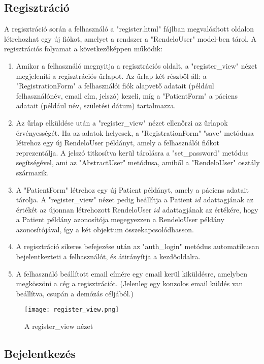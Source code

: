 \subsection{Regisztráció}

A regisztráció során a felhasználó a "register.html" fájlban megvalósított oldalon létrehozhat egy új fiókot, amelyet a rendszer a "RendeloUser" model-ben tárol. A regisztrációs folyamat a következőképpen működik:

\begin{enumerate}
	\item Amikor a felhasználó megnyitja a regisztrációs oldalt, a "register\_view" nézet megjeleníti a regisztrációs űrlapot. Az űrlap két részből áll: a "RegistrationForm" a felhasználói fiók alapvető adatait (például felhasználónév, email cím, jelszó) kezeli, míg a "PatientForm" a páciens adatait (például név, születési dátum) tartalmazza.
	\item Az űrlap elküldése után a "register\_view" nézet ellenőrzi az űrlapok érvényességét. Ha az adatok helyesek, a "RegistrationForm" "save" metódusa létrehoz egy új RendeloUser példányt, amely a felhasználói fiókot reprezentálja. A jelszó titkosítva kerül tárolásra a "set\_password" metódus segítségével, ami az "AbstractUser" metódusa, amiből a "RendeloUser" osztály származik.
	\item A "PatientForm" létrehoz egy új Patient példányt, amely a páciens adatait tárolja. A "register\_view" nézet pedig beállítja a Patient $id$ adattagjának az értékét az újonnan létrehozott RendeloUser $id$ adattagjának az értékére, hogy a Patient példány azonosítója megegyezzen a RendeloUser példány azonosítójával, így a két objektum összekapcsolódhasson.
	\item A regisztráció sikeres befejezése után az "auth\_login" metódus automatikusan bejelentkezteti a felhasználót, és átirányítja a kezdőoldalra.
	\item A felhasználó beállított email címére egy email kerül kiküldésre, amelyben megköszöni a cég a regisztrációt. (Jelenleg egy konzolos email küldés van beállítva, csupán a demózás céljából.)
\end{enumerate}

\begin{figure}[!htbp]
	\caption{A register\_view nézet}
	\label{fig:registerview}
	\centering
	\texttt{[image: register\_view.png]}
\end{figure}

\subsection{Bejelentkezés}

